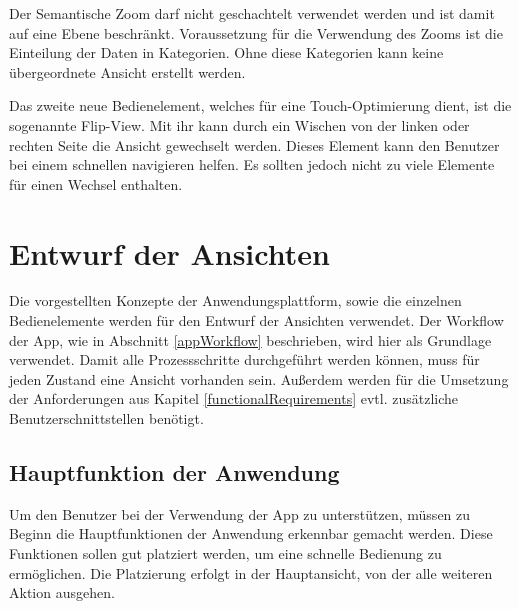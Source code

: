  Der Semantische Zoom darf nicht geschachtelt verwendet werden und ist damit auf eine Ebene beschränkt. Voraussetzung für die Verwendung des Zooms ist die Einteilung der Daten in Kategorien. Ohne diese Kategorien kann keine übergeordnete Ansicht erstellt werden.

Das zweite neue Bedienelement, welches für eine Touch-Optimierung dient, ist die sogenannte Flip-View. Mit ihr kann durch ein Wischen von der linken oder rechten Seite die Ansicht gewechselt werden. Dieses Element kann den Benutzer bei einem schnellen navigieren helfen. Es sollten jedoch nicht zu viele Elemente für einen Wechsel enthalten.

\section{Entwurf der Ansichten}
Die vorgestellten Konzepte der Anwendungsplattform, sowie die einzelnen Bedienelemente werden für den Entwurf der Ansichten verwendet. Der Workflow der App, wie in Abschnitt \ref{appWorkflow} beschrieben, wird hier als Grundlage verwendet. Damit alle Prozessschritte durchgeführt werden können, muss für jeden Zustand eine Ansicht vorhanden sein. Außerdem werden für die Umsetzung der Anforderungen aus Kapitel \ref{functionalRequirements} evtl. zusätzliche Benutzerschnittstellen benötigt.


\subsection{Hauptfunktion der Anwendung}
Um den Benutzer bei der Verwendung der App zu unterstützen, müssen zu Beginn die Hauptfunktionen der Anwendung erkennbar gemacht werden. Diese Funktionen sollen gut platziert werden, um eine schnelle Bedienung zu ermöglichen. Die Platzierung erfolgt in der Hauptansicht, von der alle weiteren Aktion ausgehen.

